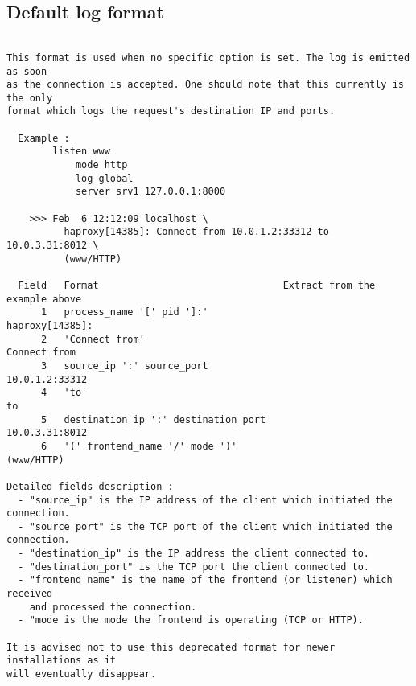 
\subsection{Default log format}

\begin{verbatim}

This format is used when no specific option is set. The log is emitted as soon
as the connection is accepted. One should note that this currently is the only
format which logs the request's destination IP and ports.

  Example :
        listen www
            mode http
            log global
            server srv1 127.0.0.1:8000

    >>> Feb  6 12:12:09 localhost \
          haproxy[14385]: Connect from 10.0.1.2:33312 to 10.0.3.31:8012 \
          (www/HTTP)

  Field   Format                                Extract from the example above
      1   process_name '[' pid ']:'                            haproxy[14385]:
      2   'Connect from'                                          Connect from
      3   source_ip ':' source_port                             10.0.1.2:33312
      4   'to'                                                              to
      5   destination_ip ':' destination_port                   10.0.3.31:8012
      6   '(' frontend_name '/' mode ')'                            (www/HTTP)

Detailed fields description :
  - "source_ip" is the IP address of the client which initiated the connection.
  - "source_port" is the TCP port of the client which initiated the connection.
  - "destination_ip" is the IP address the client connected to.
  - "destination_port" is the TCP port the client connected to.
  - "frontend_name" is the name of the frontend (or listener) which received
    and processed the connection.
  - "mode is the mode the frontend is operating (TCP or HTTP).

It is advised not to use this deprecated format for newer installations as it
will eventually disappear.


\end{verbatim}

